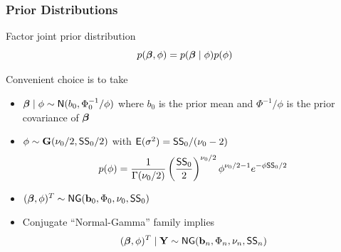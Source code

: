 \documentclass[]{beamer}
\begin{document}
\begin{frame}
  \frametitle{Prior Distributions}
Factor joint prior distribution  $$p(\boldsymbol{\beta}, \phi) = p(\boldsymbol{\beta} \mid \phi) p(\phi)$$
\pause

Convenient choice is to take \pause
\begin{itemize}
\item $\boldsymbol{\beta} \mid \phi \sim \textsf{N}(b_0, \Phi_0^{-1}/\phi)$ where $b_0$ is the prior
  mean and $\Phi^{-1}/\phi$ is the prior covariance of $\boldsymbol{\beta}$ \pause
\item $\phi \sim \mathbf{G}( \nu_0/2, \textsf{SS}_0/2)$  with $\textsf{E}(\sigma^2) =
  \textsf{SS}_0/(\nu_0 - 2)$ \pause
$$p(\phi) = \frac{1}{\Gamma{(\nu_0/2)}} 
\left(\frac{\textsf{SS}_0}{2} \right)^{\nu_0/2} 
\phi^{\nu_0/2 - 1}
 e^{- \phi \textsf{SS}_0/2}
 $$\pause
\item $(\boldsymbol{\beta}, \phi)^T \sim \textsf{NG}(\mathbf{b}_0, \Phi_0, \nu_0, \textsf{SS}_0)$ \pause
\item Conjugate  ``Normal-Gamma'' family implies \pause
$$(\boldsymbol{\beta}, \phi)^T \mid \mathbf{Y} \sim \textsf{NG}(\mathbf{b}_n, \Phi_n, \nu_n, \textsf{SS}_n)$$
\end{itemize}
\end{frame}
\end{document}
